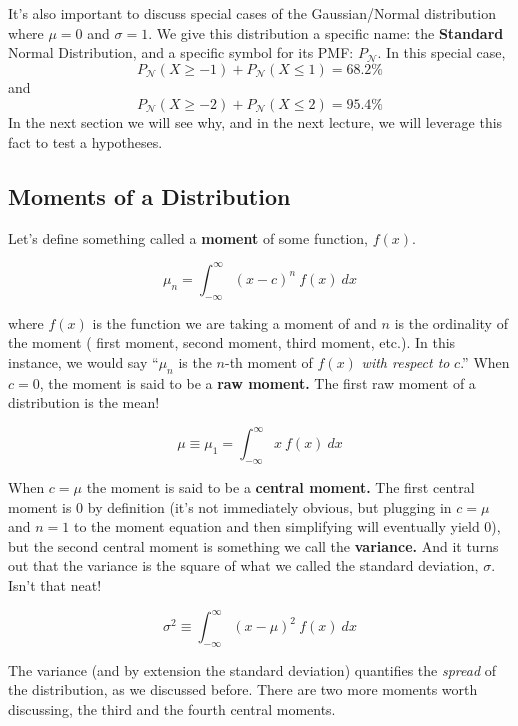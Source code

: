 It's also important to discuss special cases of the Gaussian/Normal distribution where $\mu=0$ and $\sigma=1$. We give this distribution a specific name: the \textbf{Standard} Normal Distribution, and a specific symbol for its PMF: $P_\mathcal{N}$. In this special case, $$P_\mathcal{N}(X \geq -1)  + P_\mathcal{N}(X \leq 1) = 68.2\%$$ and $$P_\mathcal{N}(X \geq -2) + P_\mathcal{N}(X \leq 2) = 95.4\%$$ In the next section we will see why, and in the next lecture, we will leverage this fact to test a hypotheses.

\subsection*{Moments of a Distribution}
Let's define something called a \textbf{moment} of some function, $f(x)$.

\begin{equation}
    \mu_n = \int^{\infty}_{-\infty} (x-c)^n\ f(x)\ dx
\end{equation}

\noindent where $f(x)$ is the function we are taking a moment of and $n$ is the ordinality of the moment (\ie{} first moment, second moment, third moment, etc.). In this instance, we would say ``$\mu_n$ is the $n$-th moment of $f(x)$ \textit{with respect to} $c$.'' When $c=0$, the moment is said to be a \textbf{raw moment.} The first raw moment of a distribution is the mean!

\begin{equation}
    \mu \equiv \mu_1 = \int^{\infty}_{-\infty} x\ f(x)\ dx
\end{equation}

When $c=\mu$ the moment is said to be a \textbf{central moment.} The first central moment is 0 by definition (it's not immediately obvious, but plugging in $c=\mu$ and $n=1$ to the moment equation and then simplifying will eventually yield 0), but the second central moment is something we call the \textbf{variance.} And it turns out that the variance is the square of what we called the standard deviation, $\sigma$. Isn't that neat!

\begin{equation}
    \sigma^2 \equiv \int^{\infty}_{-\infty} (x-\mu)^2\ f(x)\ dx
\end{equation}

The variance (and by extension the standard deviation) quantifies the \textit{spread} of the distribution, as we discussed before. There are two more moments worth discussing, the third and the fourth central moments.

